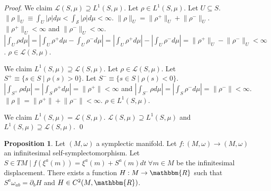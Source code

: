 \documentclass[aps,pra,10pt,twocolumn,floatfix,nofootinbib]{revtex4-1}
\numberwithin{equation}{section}
\theoremstyle{definition}
\newtheorem{prop}[equation]{Proposition}
\renewenvironment{proof}{\emph{Proof}.}{\qed}
\begin{document}
\begin{proof}
	We claim $\mathcal{L}(S,\mu) \supseteq L^1(S,\mu)$. Let $\rho \in L^1(S,\mu)$. Let $U \subseteq S$. $\lVert \rho \rVert_U \equiv \int_{U} |\rho| d\mu < \int_{\mathcal{S}} |\rho| d\mu < \infty$. $\lVert \rho \rVert_U = \lVert \rho^+ \rVert_U + \lVert \rho^- \rVert_U$. $\lVert \rho^+ \rVert_U < \infty$ and $\lVert \rho^- \rVert_U < \infty$. $|\int_{U} \rho d\mu| = |\int_{U} \rho^+ d\mu - \int_{U} \rho^- d\mu| = |\int_{U} \rho^+ d\mu| - |\int_{U} \rho^- d\mu| = \lVert \rho^+ \rVert_U - \lVert \rho^- \rVert_U < \infty$. $\rho \in\mathcal{L}(S,\mu)$.
	
	We claim $L^1(S,\mu) \supseteq \mathcal{L}(S,\mu)$.  Let $\rho \in \mathcal{L}(S,\mu)$. Let $S^+ \equiv  \{ s \in S \; | \; \rho(s) > 0\}$. Let $S^- \equiv  \{ s \in S \; | \; \rho(s) < 0\}$. $|\int_{S^+} \rho d\mu| = |\int_{S} \rho^+ d\mu| = \lVert \rho^+ \rVert < \infty$ and $|\int_{S^-} \rho d\mu| = |\int_{S} \rho^- d\mu| = \lVert \rho^- \rVert < \infty$. $\lVert \rho \rVert = \lVert \rho^+ \rVert + \lVert \rho^- \rVert < \infty$. $\rho \in L^1(S,\mu)$.
	
	We claim $L^1(S,\mu) = \mathcal{L}(S,\mu)$. $\mathcal{L}(S,\mu) \supseteq L^1(S,\mu)$ and $L^1(S,\mu) \supseteq \mathcal{L}(S,\mu)$.	
\end{proof}

\begin{prop}\label{symplectomorphism_generator}
	Let $(M, \omega)$ a symplectic manifold. Let $f: (M, \omega) \rightarrow (M, \omega)$ an infinitesimal self-symplectomorphism. Let $S \in TM \; | \; f(\xi^a(m)) = \xi^a(m) + S^a(m)dt \; \forall m \in M$ be the infinitesimal displacement. There exists a function $H: M \rightarrow \mathbbm{R}$ such that $S^{a} \omega_{ab} = \partial_{b}H$ and $H \in C^2(M, \mathbbm{R})$.
\end{prop}
\end{document}
